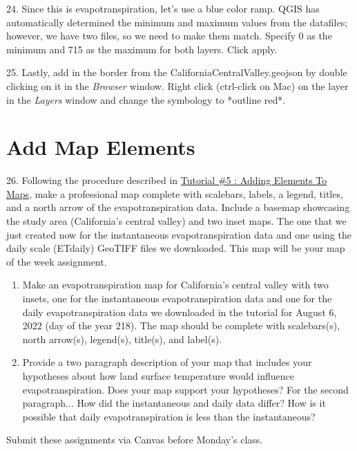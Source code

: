 \documentclass[oneside,a4paper,11pt,explicit]{book}
\begin{document}
24. Since this is evapotranspiration, let's use a blue color ramp. QGIS has automatically determined the minimum and maximum values from the datafiles; however, we have two files, so we need to make them match. Specify 0 as the minimum and 715 as the maximum for both layers. Click apply.

25. Lastly, add in the border from the CaliforniaCentralValley.geojson by double clicking on it in the \textit{Browser} window. Right click (ctrl-click on Mac) on the layer in the \textit{Layers} window and change the symbology to *outline red*. 


\section{Add Map Elements}

26. Following the procedure described in \href{https://jeremydforsythe.github.io/icecream-tutorials/Tutorial5_AddingElementsToMaps/Tutorial5_AddingElementsToMaps.pdf}{Tutorial \#5 : Adding Elements To Maps}, make a professional map complete with scalebars, labels, a legend, titles, and a north arrow of the evapotranspiration data. Include a basemap showcasing the study area (California's central valley) and two inset maps. The one that we just created now for the instantaneous evapotranspiration data and one using the daily scale (ETdaily) GeoTIFF files we downloaded. This map will be your map of the week assignment.

\begin{tcolorbox}[colback=yellow!5!white,colframe=IceCreamOrbit,title= \vspace{.2em} \Large Map of the Week Assignments]
	\large
	\begin{enumerate}
		\item Make an evapotranspiration map for California's central valley with two insets, one for the instantaneous evapotranspiration data and one for the daily evapotranspiration data we downloaded in the tutorial for August 6, 2022 (day of the year 218). The map should be complete with scalebars(s), north arrow(s), legend(s), title(s), and label(s). 
        \item Provide a two paragraph description of your map that includes your hypotheses about how land surface temperature would influence evapotranspiration. Does your map support your hypotheses? For the second paragraph... How did the instantaneous and daily data differ? How is it possible that daily evapotranspiration is less than the instantaneous?
	\end{enumerate}
	Submit these assignments via Canvas before Monday's class.
\end{tcolorbox}
\end{document}
